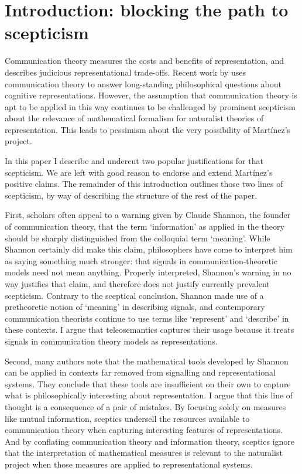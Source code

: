\section{Introduction: blocking the path to scepticism}\label{sec:intro}

Communication theory measures the costs and benefits of representation, and describes judicious representational trade-offs. 
Recent work by \citet{martinez2019deception,martinez2019representations} uses communication theory to answer long-standing philosophical questions about cognitive representations.
However, the assumption that communication theory is apt to be applied in this way continues to be challenged by prominent scepticism about the relevance of mathematical formalism for naturalist theories of representation.
This leads to pessimism about the very possibility of Mart\'{i}nez's project.

In this paper I describe and undercut two popular justifications for that scepticism.
We are left with good reason to endorse and extend Mart\'{i}nez's positive claims.
The remainder of this introduction outlines those two lines of scepticism, by way of describing the structure of the rest of the paper.

First, scholars often appeal to a warning given by Claude Shannon, the founder of communication theory, that the term `information' as applied in the theory should be sharply distinguished from the colloquial term `meaning'.
While Shannon certainly did make this claim, philosophers have come to interpret him as saying something much stronger: that signals in communication-theoretic models need not mean anything.
Properly interpreted, Shannon's warning in no way justifies that claim, and therefore does not justify currently prevalent scepticism.
Contrary to the sceptical conclusion, Shannon made use of a pretheoretic notion of `meaning' in describing signals, and contemporary communication theorists continue to use terms like `represent' and `describe' in these contexts.
I argue that teleosemantics captures their usage because it treats signals in communication theory models as representations.

Second, many authors note that the mathematical tools developed by Shannon can be applied in contexts far removed from signalling and representational systems.
They conclude that these tools are insufficient on their own to capture what is philosophically interesting about representation.
I argue that this line of thought is a consequence of a pair of mistakes.
By focusing solely on measures like mutual information, sceptics undersell the resources available to communication theory when capturing interesting features of representations.
And by conflating communication theory and information theory, sceptics ignore that the interpretation of mathematical measures is relevant to the naturalist project when those measures are applied to representational systems.

